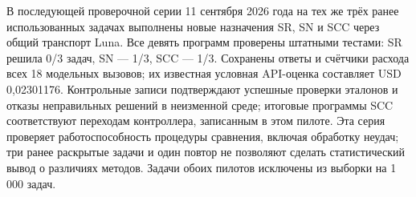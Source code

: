 В последующей проверочной серии 11 сентября 2026 года на тех же трёх ранее использованных задачах выполнены новые назначения SR, SN и SCC через общий транспорт Luna. Все девять программ проверены штатными тестами: SR решила 0/3 задач, SN --- 1/3, SCC --- 1/3. Сохранены ответы и счётчики расхода всех 18 модельных вызовов; их известная условная API-оценка составляет USD 0{,}02301176. Контрольные записи подтверждают успешные проверки эталонов и отказы неправильных решений в неизменной среде; итоговые программы SCC соответствуют переходам контроллера, записанным в этом пилоте. Эта серия проверяет работоспособность процедуры сравнения, включая обработку неудач; три ранее раскрытые задачи и один повтор не позволяют сделать статистический вывод о различиях методов. Задачи обоих пилотов исключены из выборки на 1\,000 задач.
